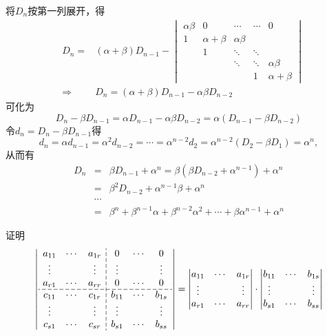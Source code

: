 \begin{solution}
将$D_n$按第一列展开，得
\begin{eqnarray*}
& D_n = & (\alpha + \beta) D_{n-1} - \begin{vmatrix}
\alpha\beta & 0 & \cdots & \cdots & 0 \\ 1 & \alpha + \beta & \alpha\beta & & \\ & 1 & \ddots & \ddots & \\ & & \ddots & \ddots & \alpha\beta \\ & & & 1 & \alpha + \beta
\end{vmatrix} \\
& \Longrightarrow & D_n = (\alpha + \beta) D_{n-1} - \alpha\beta D_{n-2}
\end{eqnarray*}
可化为
$$D_n - \beta D_{n-1}= \alpha D_{n-1} - \alpha\beta D_{n-2} = \alpha(D_{n-1} - \beta D_{n-2})$$
令$d_n = D_n - \beta D_{n-1}$得
$$d_n = \alpha d_{n-1} = \alpha^2 d_{n-2} = \cdots = \alpha^{n-2} d_2 = \alpha^{n-2}(D_2 - \beta D_1) = \alpha^n,$$
从而有
\begin{eqnarray*}
D_n & = & \beta D_{n-1} + \alpha^n = \beta (\beta D_{n-2} + \alpha^{n-1}) + \alpha^n \\
& = & \beta^2 D_{n-2} + \alpha^{n-1}\beta + \alpha^n \\
& \cdots & \\
& = & \beta^n + \beta^{n-1}\alpha + \beta^{n-2}\alpha^2 + \cdots + \beta\alpha^{n-1} + \alpha^n
\end{eqnarray*}
\end{solution}

\begin{eg} \label{eg:block_matrix}
证明
\[
  \setlength{\dashlinegap}{2pt}
  \left| \begin{array}{ccc:ccc}
    a_{11} & \cdots & a_{1r} & 0 & \cdots & 0 \\
    \vdots & & \vdots & \vdots & & \vdots \\
    a_{r1} & \cdots & a_{rr} & 0 & \cdots & 0 \\
    \hdashline
    c_{11} & \cdots & c_{1r} & b_{11} & \cdots & b_{1s} \\
    \vdots & & \vdots & \vdots & & \vdots \\
    c_{s1} & \cdots & c_{sr} & b_{s1} & \cdots & b_{ss} \\
  \end{array} \right| =
\begin{vmatrix}
a_{11} & \cdots & a_{1r} \\
\vdots & & \vdots \\
a_{r1} & \cdots & a_{rr}
\end{vmatrix} \cdot
\begin{vmatrix}
b_{11} & \cdots & b_{1s} \\
\vdots & & \vdots \\
b_{s1} & \cdots & b_{ss}
\end{vmatrix}
\]
\end{eg}

